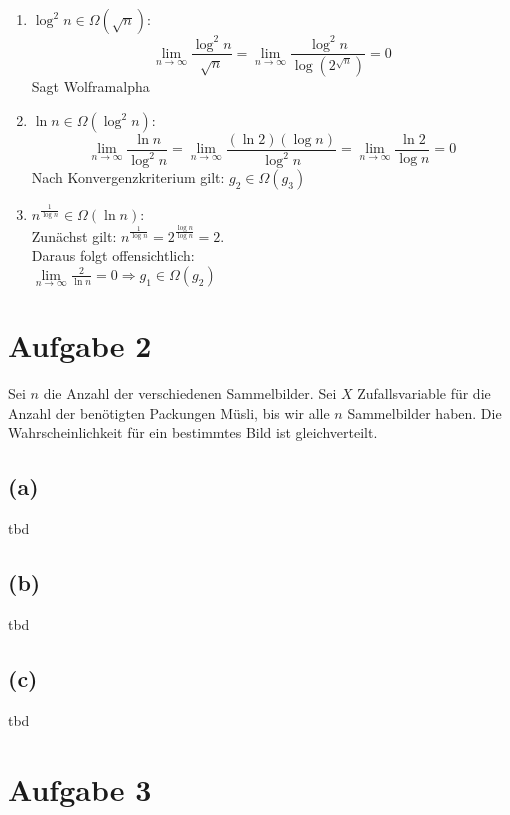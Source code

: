 \documentclass[11pt,a4paper,ngerman]{article}
\begin{document}
\begin{description}
\begin{enumerate}
\item
$\log^2 n \in \Omega (\sqrt{n})$: \\
$$\underset{n\rightarrow\infty}{\lim} \frac{\log^2 n}{\sqrt{n}} = \underset{n\rightarrow\infty}{\lim} \frac{\log^2 n}{\log (2^{\sqrt{n}})} = 0$$
Sagt Wolframalpha

\item
$\ln n \in \Omega (\log^2 n)$: \\
$$\underset{n\rightarrow\infty}{\lim} \frac{\ln n}{\log^2 n} = \underset{n\rightarrow\infty}{\lim} \frac{(\ln 2)(\log n)}{\log^2 n} = \underset{n\rightarrow\infty}{\lim} \frac{\ln 2}{\log n} = 0$$
Nach Konvergenzkriterium gilt: $g_2 \in \Omega(g_3)$
\item
$n^{\frac{1}{\log n}} \in \Omega (\ln n)$: \\
Zunächst gilt: $n^{\frac{1}{\log n}} = 2^{\frac{\log n}{\log n}} = 2$.\\
Daraus folgt offensichtlich:\\
$\underset{n\rightarrow\infty}{\lim} \frac{2}{\ln n} = 0 \Rightarrow g_1 \in \Omega (g_2)$

\end{enumerate}
\end{description}

\section*{Aufgabe 2}

Sei $n$ die Anzahl der verschiedenen Sammelbilder. Sei $X$ Zufallsvariable für die Anzahl der benötigten Packungen Müsli, bis wir alle $n$ Sammelbilder haben. Die Wahrscheinlichkeit für ein bestimmtes Bild ist gleichverteilt.

\subsection*{(a)}

tbd

\subsection*{(b)}

 tbd

\subsection*{(c)}

tbd


\section*{Aufgabe 3}
\end{document}
